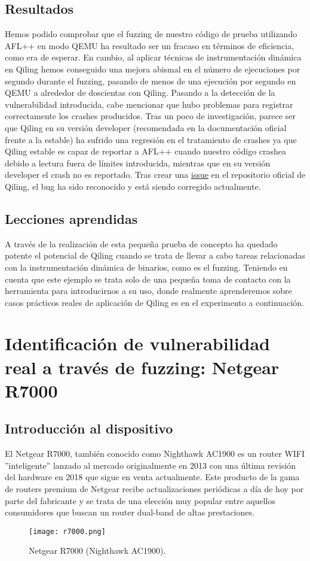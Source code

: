 \subsection{Resultados}
Hemos podido comprobar que el fuzzing de nuestro código de prueba utilizando AFL++ en modo QEMU ha resultado ser un fracaso en términos de 
eficiencia, como era de esperar. En cambio,
al aplicar técnicas de instrumentación dinámica en Qiling hemos conseguido una mejora abismal en el número de ejecuciones por segundo durante el fuzzing, 
pasando de menos de una ejecución por segundo en QEMU a alrededor de doscientas con Qiling. Pasando a la detección de la vulnerabilidad introducida, 
cabe mencionar que hubo problemas para registrar correctamente los crashes producidos. Tras un poco de investigación, parece ser que Qiling en su versión developer
(recomendada en la documentación oficial frente a la estable) ha sufrido una regresión en el tratamiento de crashes ya que Qiling estable es capaz de 
reportar a AFL++ cuando nuestro código crashea debido a lectura fuera de límites introducida, mientras que en su versión developer el crash no es reportado.
Tras crear una \href{https://github.com/qilingframework/qiling/issues/1163}{issue} en el repositorio oficial de Qiling\cite{qiling}, el bug ha sido reconocido y está siendo corregido actualmente.


\subsection{Lecciones aprendidas}
A través de la realización de esta pequeña prueba de concepto ha quedado patente el potencial de Qiling cuando se trata de llevar a cabo tareas relacionadas
con la instrumentación dinámica de binarios, como es el fuzzing. Teniendo en cuenta que este ejemplo se trata solo de una pequeña toma de contacto con la herramienta
para introducirnos a su uso, donde realmente aprenderemos sobre casos prácticos reales de aplicación de Qiling es en el experimento a continuación.

\section{Identificación de vulnerabilidad real a través de fuzzing: Netgear R7000}
\subsection{Introducción al dispositivo}
El Netgear R7000, también conocido como Nighthawk AC1900 es un router WIFI ''inteligente'' lanzado al mercado originalmente en 2013 con una última
revisión del hardware en 2018 que sigue en venta actualmente. Este producto de la gama de routers premium de Netgear recibe actualizaciones periódicas
a día de hoy por parte del fabricante y se trata de una elección muy popular entre aquellos consumidores que buscan un router dual-band de altas prestaciones. 
\begin{figure}[H]
    \centering
    \texttt{[image: r7000.png]}
    \caption{Netgear R7000 (Nighthawk AC1900).}
    \label{fig:r7000}
\end{figure}

